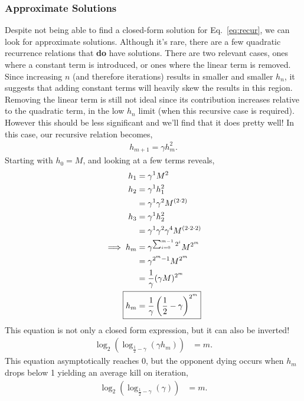 \documentclass[../../main.tex]{subfiles}
\begin{document}
		\subsubsection{Approximate Solutions}
			Despite not being able to find a closed-form solution for Eq.~\ref{eq:recur}, we can look for approximate solutions. Although it's rare, there are a few quadratic recurrence relations that \textbf{do} have solutions. There are two relevant cases, ones where a constant term is introduced, or ones where the linear term is removed. Since increasing $n$ (and therefore iterations) results in smaller and smaller $h_n$, it suggests that adding constant terms will heavily skew the results in this region. Removing the linear term is still not ideal since its contribution increases relative to the quadratic term, in the low $h_n$ limit (when this recursive case is required). However this should be less significant and we'll find that it does pretty well! In this case, our recursive relation becomes,
			\begin{align}
				h_{m+1} = \gamma h_m^2.
			\end{align}
			Starting with $h_0 = M$, and looking at a few terms reveals,
			\begin{align}
				h_{1} &= \gamma^1 M^2\\
				h_{2} &= \gamma^1 h_1^2\\
					&= \gamma^1 \gamma^2 M^{(2\cdot2)}\\
				h_{3} &= \gamma^1 h_2^2\\
					&= \gamma^1 \gamma^2 \gamma^4 M^{(2\cdot2\cdot2)}\\
				\implies h_m &= \gamma^{\sum_{i=0}^{m-1} 2^i} M^{2^m}\\
							&= \gamma^{2^m-1} M^{2^m}\\
							&= \frac{1}{\gamma}(\gamma M)^{2^m}\\
						\Aboxed{h_m &= \frac{1}{\gamma}\left(\frac{1}{2} - \gamma\right)^{2^m}}
			\end{align}
			This equation is not only a closed form expression, but it can also be inverted!
			\begin{align}
				\log_2(\log_{\frac{1}{2} - \gamma} (\gamma h_m)) &= m.
			\end{align}
			This equation asymptotically reaches 0, but the opponent dying occurs when $h_m$ drops below 1 yielding an average kill on iteration,
			\begin{align}
				\log_2(\log_{\frac{1}{2} - \gamma} (\gamma)) &= m.
			\end{align}
\end{document}
